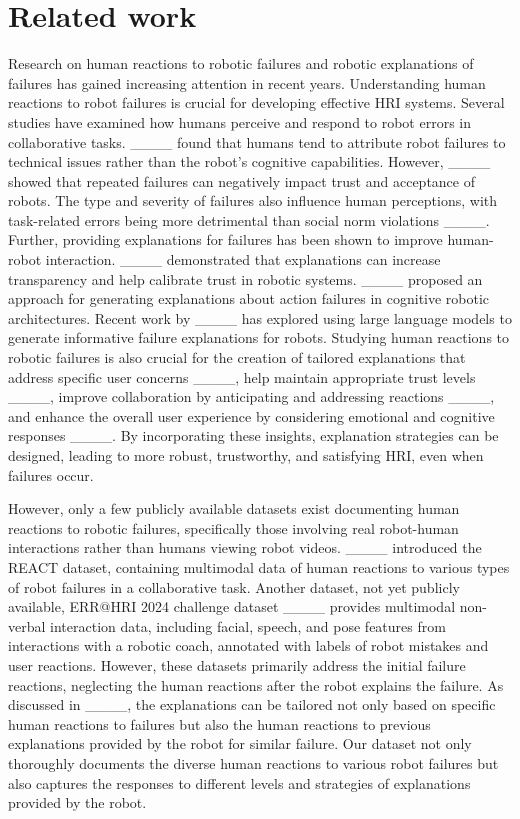 \section{Related work}
Research on human reactions to robotic failures and robotic explanations of failures has gained increasing attention in recent years. 
Understanding human reactions to robot failures is crucial for developing effective HRI systems. Several studies have examined how humans perceive and respond to robot errors in collaborative tasks. ____ found that humans tend to attribute robot failures to technical issues rather than the robot's cognitive capabilities. However, ____ showed that repeated failures can negatively impact trust and acceptance of robots. The type and severity of failures also influence human perceptions, with task-related errors being more detrimental than social norm violations ____. Further, providing explanations for failures has been shown to improve human-robot interaction. ____ demonstrated that explanations can increase transparency and help calibrate trust in robotic systems. ____ proposed an approach for generating explanations about action failures in cognitive robotic architectures. Recent work by ____ has explored using large language models to generate informative failure explanations for robots.
Studying human reactions to robotic failures is also crucial for the creation of tailored explanations that address specific user concerns ____, help maintain appropriate trust levels ____, improve collaboration by anticipating and addressing reactions ____, and enhance the overall user experience by considering emotional and cognitive responses ____. By incorporating these insights, explanation strategies can be designed, leading to more robust, trustworthy, and satisfying HRI, even when failures occur.

However, only a few publicly available datasets exist documenting human reactions to robotic failures, specifically those involving real robot-human interactions rather than humans viewing robot videos.
____ introduced the REACT dataset, containing multimodal data of human reactions to various types of robot failures in a collaborative task.
Another dataset, not yet publicly available, ERR@HRI 2024 challenge dataset ____ provides multimodal non-verbal interaction data, including facial, speech, and pose features from interactions with a robotic coach, annotated with labels of robot mistakes and user reactions. However, these datasets primarily address the initial failure reactions, neglecting the human reactions after the robot explains the failure. As discussed in ____, the explanations can be tailored not only based on specific human reactions to failures but also the human reactions to previous explanations provided by the robot for similar failure. Our dataset not only thoroughly documents the diverse human reactions to various robot failures but also captures the responses to different levels and strategies of explanations provided by the robot.